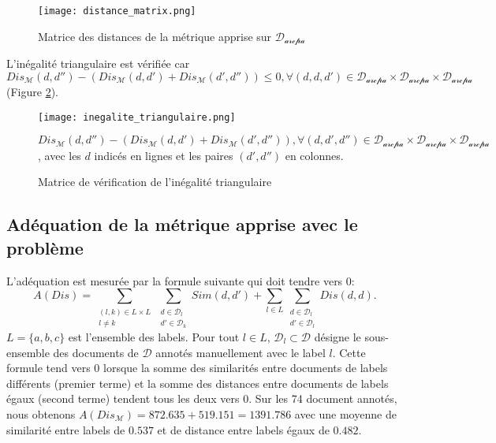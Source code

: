 \begin{figure}[!htb]
	\centering \texttt{[image: distance\_matrix.png]}
	\caption{Matrice des distances de la métrique apprise sur $\mathcal{D_{\text{arcpa}}}$}\label{fig:similarite:distance_matrix}
\end{figure}

L'inégalité triangulaire est vérifiée car $Dis_\mathcal{M}(d,d'') - (Dis_\mathcal{M}(d,d') + Dis_\mathcal{M}(d',d'')) \leq 0, \forall (
d,d,d') \in \mathcal{D_{\text{arcpa}}} \times \mathcal{D_{\text{arcpa}}} \times \mathcal{D_{\text{arcpa}}}$ (Figure \ref{fig:similarite:matrice_inegalite_triangulaire}).

\begin{figure}[!htb]
	\centering \texttt{[image: inegalite\_triangulaire.png]}
	
	\scriptsize{$Dis_\mathcal{M}(d,d'') - (Dis_\mathcal{M}(d,d') + Dis_\mathcal{M}(d',d'')), \forall (d,d',d'') \in \mathcal{D_{\text{arcpa}}} \times \mathcal{D_{\text{arcpa}}} \times \mathcal{D_{\text{arcpa}}}$, avec les $d$ indicés en lignes et les paires $(d',d'')$ en colonnes.}
	\caption{Matrice de vérification de l'inégalité triangulaire}\label{fig:similarite:matrice_inegalite_triangulaire}
\end{figure}
 


\subsection{Adéquation de la métrique apprise avec le problème}
\label{sec:similarite:adequation}
L'adéquation est mesurée par la formule suivante qui doit tendre vers 0: \[A(Dis) = \sum\limits_{\substack{(l,k) \in L \times L \\ l \neq k}} \sum\limits_{\substack{d \in \mathcal{D}_l \\ d' \in \mathcal{D}_k}} Sim(d,d') + \sum\limits_{l \in L} \sum\limits_{\substack{d \in \mathcal{D}_l \\ d' \in \mathcal{D}_l}} Dis(d,d). \] $L = \lbrace a, b, c \rbrace$ est l'ensemble des labels. Pour tout $l \in L$, $\mathcal{D}_l \subset \mathcal{D}$ désigne le sous-ensemble des documents de $\mathcal{D}$ annotés manuellement avec le label $l$. Cette formule tend vers 0 lorsque la somme des similarités entre documents de labels différents (premier terme) et la somme des distances entre documents de labels égaux (second terme) tendent tous les deux vers 0.
Sur les 74 document annotés, nous obtenons $A(Dis_\mathcal{M}) = 872.635 + 519.151 = 1391.786$ avec une moyenne de similarité entre labels de $0.537$ et de distance entre labels égaux de $0.482$.


